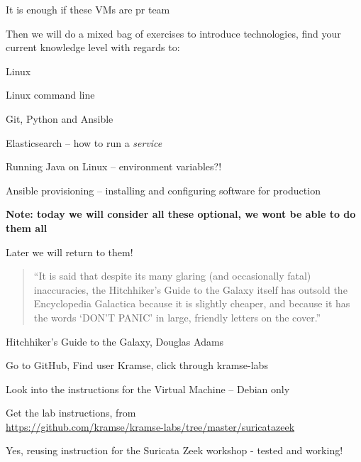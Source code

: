\documentclass[Screen16to9,17pt]{foils}
\begin{document}
\centerline{It is enough if these VMs are pr team}



Then we will do a mixed bag of exercises to introduce technologies, find your current knowledge level with regards to:

\begin{list2}
\item Linux
\item Linux command line
\item Git, Python and Ansible
\item Elasticsearch -- how to run a \emph{service}
\item Running Java on Linux -- environment variables?!
\item Ansible provisioning -- installing and configuring software for production
\end{list2}

{\bf Note: today we will consider all these optional, we wont be able to do them all}

Later we will return to them!



\begin{quote}
“It is said that despite its many glaring (and occasionally fatal) inaccuracies, the Hitchhiker’s Guide to the Galaxy itself has outsold the Encyclopedia Galactica because it is slightly cheaper, and because it has the words ‘DON’T PANIC’ in large, friendly letters on the cover.”
\end{quote}
Hitchhiker’s Guide to the Galaxy, Douglas Adams


\begin{list2}
\item Go to GitHub, Find user Kramse, click through kramse-labs
\item Look into the instructions for the Virtual Machine -- Debian only

\item Get the lab instructions, from\\ {\footnotesize\url{https://github.com/kramse/kramse-labs/tree/master/suricatazeek}}
\end{list2}

Yes, reusing instruction for the Suricata Zeek workshop - tested and working!
\end{document}
